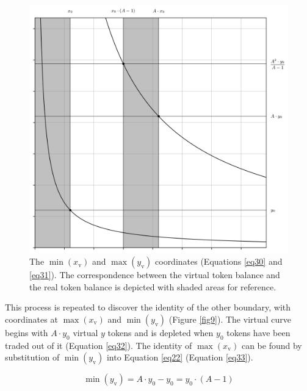 \documentclass{article}
\begin{document}
\begin{figure}[ht]
    \centering
    \includegraphics[width=\textwidth]{fig08.png}
    \captionsetup{
        justification=raggedright,
        singlelinecheck=false,
        font=small,
        labelfont=bf,
        labelsep=quad,
        format=plain
    }
    \caption{The $\min\left( x_{\text{v}} \right)$ and $\max\left( y_{\text{v}} \right)$ coordinates (Equations \ref{eq30} and \ref{eq31}). The correspondence between the virtual token balance and the real token balance is depicted with shaded areas for reference.}
    \label{fig8}
\end{figure}

This process is repeated to discover the identity of the other boundary, with coordinates at $\max\left( x_{\text{v}} \right)$ and $\min\left( y_{\text{v}} \right)$ (Figure \ref{fig9}). The virtual curve begins with $A \cdot y_{0}$ virtual $y$ tokens and is depleted when $y_{0}$ tokens have been traded out of it (Equation \ref{eq32}). The identity of $\max\left( x_{\text{v}} \right)$ can be found by substitution of $\min\left( y_{\text{v}} \right)$ into Equation \ref{eq22} (Equation \ref{eq33}).

\begin{equation} \label{eq32}
\min\left( y_{\text{v}} \right) = A \cdot y_{0} - y_{0} = y_{0} \cdot \left( A - 1 \right)
\end{equation}
\end{document}
